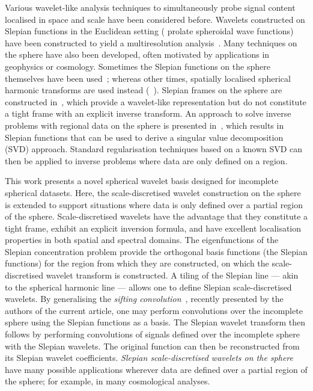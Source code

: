 Various wavelet-like analysis techniques to simultaneously probe signal content localised in space and scale have been considered before.
Wavelets constructed on Slepian functions in the Euclidean setting (\ie{} prolate spheroidal wave functions) have been constructed to yield a multiresolution analysis~\cite{Walter2004}.
Many techniques on the sphere have also been developed, often motivated by applications in geophysics or cosmology.
Sometimes the Slepian functions on the sphere themselves have been used~\cite{Simons2009}; whereas other times, spatially localised spherical harmonic transforms are used instead (\eg{}~\cite{Simons1997,Wieczorek2005,Khalid2013,Khalid2013a}).
Slepian frames on the sphere are constructed in~\cite{Simons2011}, which provide a wavelet-like representation but do not constitute a tight frame with an explicit inverse transform.
An approach to solve inverse problems with regional data on the sphere is presented in~\cite{Michel2017}, which results in Slepian functions that can be used to derive a singular value decomposition (SVD) approach.
Standard regularisation techniques based on a known SVD can then be applied to inverse problems where data are only defined on a region.

This work presents a novel spherical wavelet basis designed for incomplete spherical datasets.
Here, the scale-discretised wavelet construction on the sphere~\cite{Wiaux2008,McEwen2018,Leistedt2013,McEwen2013,McEwen2015} is extended to support situations where data is only defined over a partial region of the sphere.
Scale-discretised wavelets have the advantage that they constitute a tight frame, exhibit an explicit inversion formula, and have excellent localisation properties in both spatial and spectral domains.
The eigenfunctions of the Slepian concentration problem provide the orthogonal basis functions (the Slepian functions) for the region from which they are constructed, on which the scale-discretised wavelet transform is constructed.
A tiling of the Slepian line --- akin to the spherical harmonic line --- allows one to define Slepian scale-discretised wavelets.
By generalising the \emph{sifting convolution}~\cite{Roddy2021}, recently presented by the authors of the current article, one may perform convolutions over the incomplete sphere using the Slepian functions as a basis.
The Slepian wavelet transform then follows by performing convolutions of signals defined over the incomplete sphere with the Slepian wavelets.
The original function can then be reconstructed from its Slepian wavelet coefficients.
\emph{Slepian scale-discretised wavelets on the sphere} have many possible applications wherever data are defined over a partial region of the sphere; for example, in many cosmological analyses.


